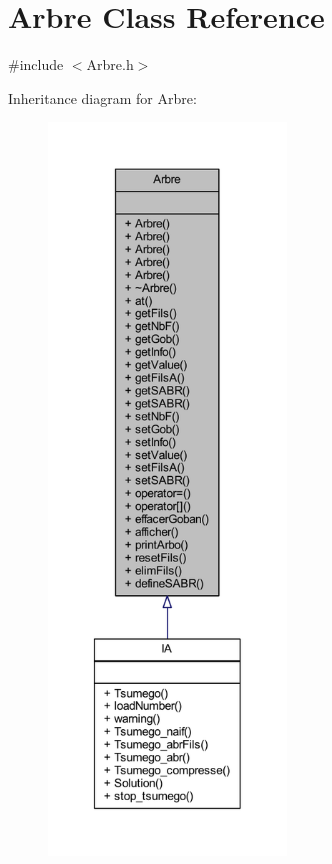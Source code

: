 \hypertarget{class_arbre}{}\section{Arbre Class Reference}
\label{class_arbre}


{\ttfamily \#include $<$Arbre.\+h$>$}



Inheritance diagram for Arbre\+:
\nopagebreak
\begin{figure}[H]
\begin{center}
\leavevmode
\includegraphics[height=550pt]{class_arbre__inherit__graph}
\end{center}
\end{figure}


